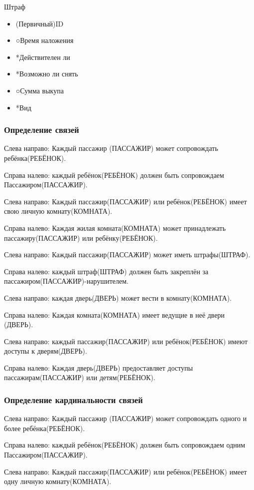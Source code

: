 Штраф
\begin{itemize}
	\item (Первичный)ID
	\item ○Время наложения
	\item *Действителен ли
	\item *Возможно ли снять
	\item ○Сумма выкупа
	\item *Вид
	
\end{itemize}

\subsubsection{Определение связей}

Слева направо: Каждый пассажир (ПАССАЖИР) может сопровождать ребёнка(РЕБЁНОК).

Справа налево: каждый ребёнок(РЕБЁНОК) должен быть сопровождаем Пассажиром(ПАССАЖИР).

Слева направо: Каждый пассажир(ПАССАЖИР) или ребёнок(РЕБЁНОК) имеет свою личную комнату(КОМНАТА).

Справа налево: Каждая жилая комната(КОМНАТА) может принадлежать пассажиру(ПАССАЖИР) или ребёнку(РЕБЁНОК). 

Слева направо: Каждый пассажир(ПАССАЖИР) может иметь штрафы(ШТРАФ).

Справа налево: каждый штраф(ШТРАФ) должен быть закреплён за  пассажиром(ПАССАЖИР)-нарушителем.

Слева направо: каждая дверь(ДВЕРЬ) может вести в комнату(КОМНАТА).

Справа налево: Каждая комната(КОМНАТА) имеет ведущие в неё двери (ДВЕРЬ).

Слева направо: каждый пассажир(ПАССАЖИР) или ребёнок(РЕБЁНОК) имеют доступы к дверям(ДВЕРЬ).

Справа налево: Каждая дверь(ДВЕРЬ) предоставляет доступы пассажирам(ПАССАЖИР) или детям(РЕБЁНОК).

\subsubsection{Определение кардинальности связей}

Слева направо: Каждый пассажир (ПАССАЖИР) может сопровождать одного и более ребёнка(РЕБЁНОК).

Справа налево: каждый ребёнок(РЕБЁНОК) должен быть сопровождаем одним Пассажиром(ПАССАЖИР).

Слева направо: Каждый пассажир(ПАССАЖИР) или ребёнок(РЕБЁНОК) имеет одну личную комнату(КОМНАТА).

